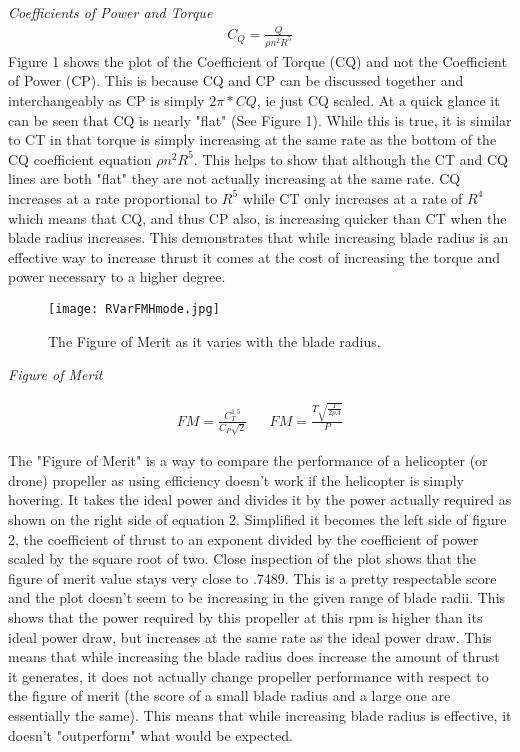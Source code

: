 \documentclass[12pt]{texmemo} %
\begin{document}
\textit{Coefficients of Power and Torque} 
\begin{align}
 C_Q = \frac {Q}{\rho n^2 R^5} 
 \end{align}
Figure 1 shows the plot of the Coefficient of Torque (CQ) and not the Coefficient of Power (CP). This is because CQ and CP can be discussed together and interchangeably as CP is simply $2\pi*CQ$, ie just CQ scaled. At a quick glance it can be seen that CQ is nearly "flat" (See Figure 1). While this is true, it is similar to CT in that torque is simply increasing at the same rate as the bottom of the CQ coefficient equation $\rho n^2 R^5$. This helps to show that although the CT and CQ lines are both "flat" they are not actually increasing at the same rate. CQ increases at a rate proportional to $R^5$ while CT only increases at a rate of $R^4$ which means that CQ, and thus CP also, is increasing quicker than CT when the blade radius increases. This demonstrates that while increasing blade radius is an effective way to increase thrust it comes at the cost of increasing the torque and power necessary to a higher degree.
\vspace{5mm} %

\begin{figure}[h]
\centering
\texttt{[image: RVarFMHmode.jpg]}
\caption{The Figure of Merit as it varies with the blade radius.}
\end{figure}
\vspace{5mm} %

\textit{Figure of Merit} 

\begin{align}
FM = \frac{ C_T^{1.5}}{C_P \sqrt{2}} && FM = \frac{T\sqrt{\frac{T}{2\rho A}}}{P}
\end{align}

The "Figure of Merit" is a way to compare the performance of a helicopter (or drone) propeller as using efficiency doesn't work if the helicopter is simply hovering. It takes the ideal power and divides it by the power actually required as shown on the right side of equation 2. Simplified it becomes the left side of figure 2, the coefficient of thrust to an exponent divided by the coefficient of power scaled by the square root of two. Close inspection of the plot shows that the figure of merit value stays very close to .7489. This is a pretty respectable score and the plot doesn't seem to be increasing in the given range of blade radii. This shows that the power required by this propeller at this rpm is higher than its ideal power draw, but increases at the same rate as the ideal power draw. This means that while increasing the blade radius does increase the amount of thrust it generates, it does not actually change propeller performance with respect to the figure of merit (the score of a small blade radius and a large one are essentially the same). This means that while increasing blade radius is effective, it doesn't "outperform" what would be expected.
\end{document}

